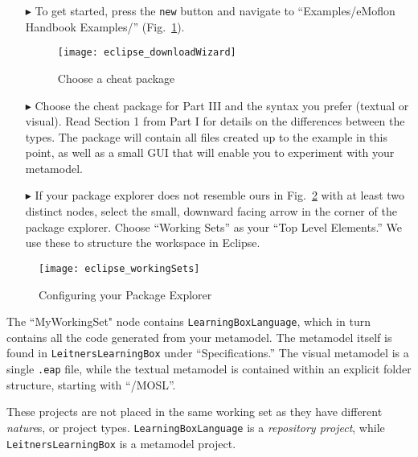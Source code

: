 \begin{itemize}

\item[$\blacktriangleright$] To get started, press the \texttt{new} button and navigate to ``Examples/eMoflon Handbook Examples/''
(Fig.~\ref{fig:downloadWizard}).

\begin{figure}[htbp]
	\centering
  \texttt{[image: eclipse\_downloadWizard]}
	\caption{Choose a cheat package}
	\label{fig:downloadWizard}
\end{figure}

\item[$\blacktriangleright$] Choose the cheat package for Part III and the syntax you prefer (textual or visual). Read Section 1 from Part I for details on
the differences between the types. The package will contain all files created up to the example in this point, as well as a small GUI that will enable you to
experiment with your metamodel.

\newpage

\vspace*{0.5cm}

\item[$\blacktriangleright$] If your package explorer does not resemble ours in Fig.~\ref{fig:workingSets} with at least two distinct nodes, select the
small, downward facing arrow in the corner of the package explorer. Choose ``Working Sets'' as your ``Top Level Elements.'' We use these to structure the
workspace in Eclipse.

\vspace{0.75cm}

\end{itemize}

\begin{figure}[htbp]
	\centering
  \texttt{[image: eclipse\_workingSets]}
	\caption{Configuring your Package Explorer}
	\label{fig:workingSets}
\end{figure}

The ``MyWorkingSet" node contains \texttt{Learn\-ing\-Box\-Lang\-uage}, which in turn contains all the code generated from your metamodel. The metamodel itself
is found in \texttt{Leit\-ners\-Learn\-ing\-Box} under ``Specifications.'' The visual metamodel is a single \texttt{.eap} file, while the textual metamodel is
contained within an explicit folder structure, starting with ``/MOSL''. 

These projects are not placed in the same working set as they have different \emph{nature}s, or project types. \texttt{Learning\-Box\-Language} is a
\emph{repository project}, while \texttt{LeitnersLearningBox} is a metamodel project.

